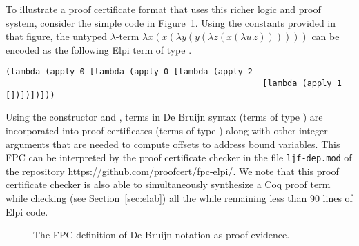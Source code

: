 To illustrate a proof certificate format that uses this richer logic
and proof system, consider the simple \lP code in
Figure~\ref{fig:debruijn}.  Using the constants provided in that
figure, the untyped $\lambda$-term
$\lambda x (x (\lambda y (y (\lambda z (x (\lambda u\,z))))))$ can be
encoded as the following Elpi term of type .
%
\begin{lstlisting}[basicstyle=\ttfamily,language=lprolog]
(lambda (apply 0 [lambda (apply 0 [lambda (apply 2 
                                                    [lambda (apply 1 [])])])]))
\end{lstlisting}
Using the constructor  and , terms in De Bruijn
syntax (terms of type ) are incorporated into proof
certificates (terms of type ) along with other integer
arguments that are needed to compute offsets to address bound
variables.  
%
This FPC can be interpreted by the proof certificate checker in the
file \verb+ljf-dep.mod+ of the repository
\url{https://github.com/proofcert/fpc-elpi/}.  We note that this proof
certificate checker is also able to simultaneously synthesize a Coq
proof term while checking (see Section~\ref{sec:elab}) all the while
remaining less than 90 lines of Elpi code.

\begin{figure}


\caption{The FPC definition of De Bruijn notation as proof evidence.}
\label{fig:debruijn}
\end{figure}



